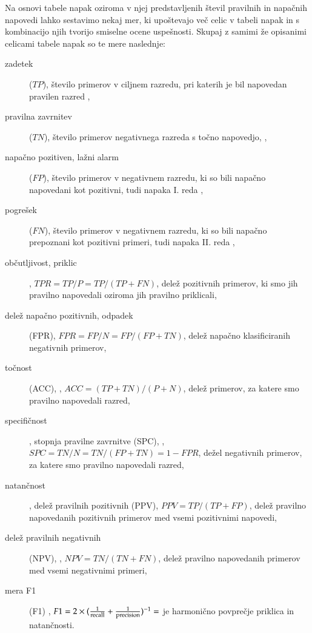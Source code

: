 Na osnovi tabele napak oziroma v njej predstavljenih števil pravilnih in napačnih napovedi lahko sestavimo nekaj mer, ki upoštevajo več celic v tabeli napak in s kombinacijo njih tvorijo smiselne ocene uspešnosti. Skupaj z samimi že opisanimi celicami tabele napak so te mere naslednje:
%
\begin{description}
\item[zadetek] ($TP$), število primerov v ciljnem razredu, pri katerih je bil napovedan pravilen razred ,
\item[pravilna zavrnitev]($TN$), število primerov negativnega razreda s točno napovedjo, ,
\item[napačno pozitiven, lažni alarm] ($FP$), število primerov v negativnem razredu, ki so bili napačno napovedani kot pozitivni, tudi napaka I. reda ,
\item[pogrešek] ($FN$), število primerov v negativnem razredu, ki so bili napačno prepoznani kot pozitivni primeri, tudi napaka II. reda ,
\item[občutljivost, priklic] , $TPR = {TP / P} = {TP / (TP+FN)} $, delež pozitivnih primerov, ki smo jih pravilno napovedali oziroma jih pravilno priklicali,
\item[delež napačno pozitivnih, odpadek] (FPR),  $FPR = FP / N = FP / (FP + TN)$, delež napačno klasificiranih negativnih primerov,
\item[točnost] (ACC), , $ACC = (TP + TN) / (P + N)$, delež primerov, za katere smo pravilno napovedali razred,
\item[specifičnost], stopnja pravilne zavrnitve (SPC), , $SPC = TN / N = TN / (FP + TN) = 1 - FPR$, dežel negativnih primerov, za katere smo pravilno napovedali razred,
\item[natančnost], delež pravilnih pozitivnih (PPV),  $PPV = TP / (TP + FP)$, delež pravilno napovedanih pozitivnih primerov med vsemi pozitivnimi napovedi,
\item[delež pravilnih negativnih] (NPV), , $NPV = TN / (TN + FN)$, delež pravilno napovedanih primerov med vsemi negativnimi primeri,
\item[mera F1] (F1) , $F1 = 2\times(\frac{1}{\rm recall}+\frac{1}{\rm precision})^{-1}=$ je harmonično povprečje priklica in natančnosti.
\end{description}

